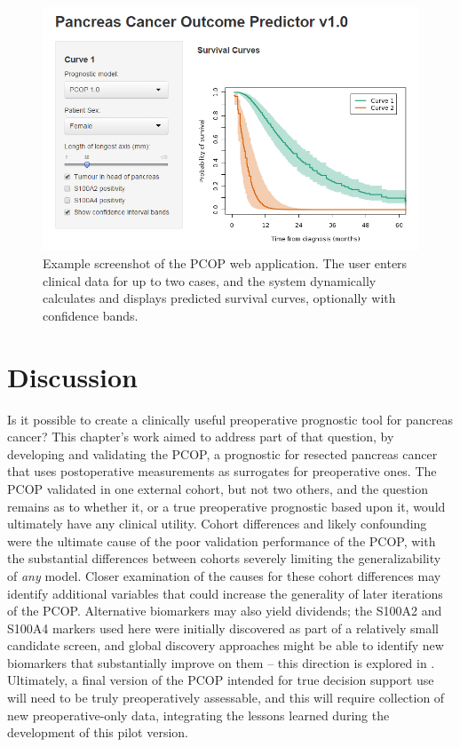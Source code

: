 \documentclass[dissertation.tex]{subfiles}
\begin{document}
\begin{figure}[!htbp]
\centering
  \includegraphics[width=1\linewidth]{analysis/nomogram/webapp/PCOP.png}
\caption[Example screenshot of the \texorpdfstring{\acrshort{PCOP}}{PCOP} web application]{Example screenshot of the \gls{PCOP} web application.  The user enters clinical data for up to two cases, and the system dynamically calculates and displays predicted survival curves, optionally with confidence bands.}
\label{fig:nomo-web-example}
\end{figure}

\section{Discussion}
Is it possible to create a clinically useful preoperative prognostic tool for pancreas cancer?  This chapter's work aimed to address part of that question, by developing and validating the \gls{PCOP}, a prognostic for resected pancreas cancer that uses postoperative measurements as surrogates for preoperative ones.  The \gls{PCOP} validated in one external cohort, but not two others, and the question remains as to whether it, or a true preoperative prognostic based upon it, would ultimately have any clinical utility.  Cohort differences and likely confounding were the ultimate cause of the poor validation performance of the \gls{PCOP}, with the substantial differences between cohorts severely limiting the generalizability of \emph{any} model.  Closer examination of the causes for these cohort differences may identify additional variables that could increase the generality of later iterations of the \gls{PCOP}.  Alternative biomarkers may also yield dividends; the S100A2 and S100A4 markers used here were initially discovered as part of a relatively small candidate screen, and global discovery approaches might be able to identify new biomarkers that substantially improve on them -- this direction is explored in .  Ultimately, a final version of the \gls{PCOP} intended for true decision support use will need to be truly preoperatively assessable, and this will require collection of new preoperative-only data, integrating the lessons learned during the development of this pilot version.
\end{document}
